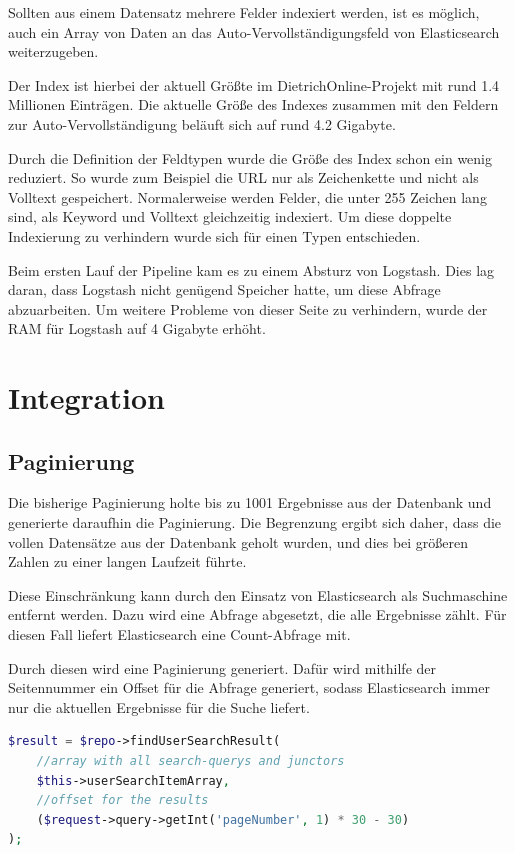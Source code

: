 Sollten aus einem Datensatz mehrere Felder indexiert werden, ist es möglich, auch ein Array von Daten an das Auto-Vervollständigungsfeld von Elasticsearch weiterzugeben.

Der Index ist hierbei der aktuell Größte im DietrichOnline-Projekt mit rund 1.4 Millionen Einträgen. Die aktuelle Größe des Indexes zusammen mit den Feldern zur Auto-Vervollständigung beläuft sich auf rund 4.2 Gigabyte. 

Durch die Definition der Feldtypen wurde die Größe des Index schon ein wenig reduziert. So wurde zum Beispiel die URL nur als Zeichenkette und nicht als Volltext gespeichert. Normalerweise werden Felder, die unter 255 Zeichen lang sind, als Keyword und Volltext gleichzeitig indexiert. Um diese doppelte Indexierung zu verhindern wurde sich für einen Typen entschieden.

Beim ersten Lauf der Pipeline kam es zu einem Absturz von Logstash. Dies lag daran, dass Logstash nicht genügend Speicher hatte, um diese Abfrage abzuarbeiten. Um weitere Probleme von dieser Seite zu verhindern, wurde der RAM für Logstash auf 4 Gigabyte erhöht. \cite{ElasticsearchB.V..13.2.2020}

\section{Integration}

\subsection{Paginierung}

Die bisherige Paginierung holte bis zu 1001 Ergebnisse aus der Datenbank und generierte daraufhin die Paginierung. Die Begrenzung ergibt sich daher, dass die vollen Datensätze aus der Datenbank geholt wurden, und dies bei größeren Zahlen zu einer langen Laufzeit führte.

Diese Einschränkung kann durch den Einsatz von Elasticsearch als Suchmaschine entfernt werden. Dazu wird eine Abfrage abgesetzt, die alle Ergebnisse zählt. Für diesen Fall liefert Elasticsearch eine Count-Abfrage mit.

Durch diesen wird eine Paginierung generiert. Dafür wird mithilfe der Seitennummer ein Offset für die Abfrage generiert, sodass Elasticsearch immer nur die aktuellen Ergebnisse für die Suche liefert.

\begin{lstlisting}[language=PHP, frame=single, label={lst:generierung},  caption=Generierung des Offsets für die Paginierung,captionpos=b] 
$result = $repo->findUserSearchResult(
    //array with all search-querys and junctors
    $this->userSearchItemArray, 
    //offset for the results
    ($request->query->getInt('pageNumber', 1) * 30 - 30)
);
\end{lstlisting}

